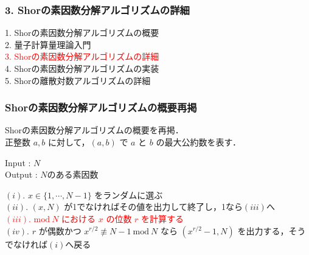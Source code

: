 \documentclass[dvipdfmx,12pt]{beamer}
\begin{document}
\begin{frame}

\frametitle{3. Shorの素因数分解アルゴリズムの詳細}
          
1. Shorの素因数分解アルゴリズムの概要 \\
2. 量子計算量理論入門 \\
\textcolor{red}{3. Shorの素因数分解アルゴリズムの詳細} \\
4. Shorの素因数分解アルゴリズムの実装 \\
5. Shorの離散対数アルゴリズムの詳細

\end{frame}


\begin{frame}

\frametitle{Shorの素因数分解アルゴリズムの概要再掲}

Shorの素因数分解アルゴリズムの概要を再掲．\\
正整数 $ a, b $ に対して，$ (a, b) $ で $a$ と $b$ の最大公約数を表す．\\

\vspace{10pt}

Input : $N$ \\
Output : $N$のある素因数 \\

\vspace{10pt}

$(i)$. $ x \in \{ 1, \cdots, N - 1 \} $ をランダムに選ぶ \\
$(ii)$. $ (x, N) $ が1でなければその値を出力して終了し，1なら$(iii)$へ \\
\textcolor{red}{$(iii)$. $ \mathrm{mod} \ N $ における $x$ の位数 $r$ を計算する} \\
$(iv)$. $r$ が偶数かつ $ x^{r/2} \not\equiv N - 1 \ \mathrm{mod} \ N $ なら $ (x^{r/2} - 1, N) $ を出力する，そうでなければ$(i)$へ戻る

\end{frame}
\end{document}
